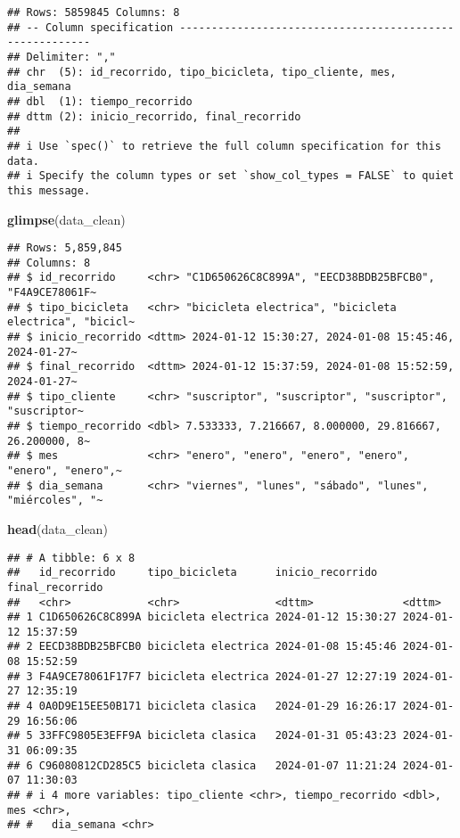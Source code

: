 \documentclass[
]{article}
\newenvironment{Shaded}{\begin{snugshade}}{\end{snugshade}}
\newcommand{\FunctionTok}[1]{\textcolor[rgb]{0.13,0.29,0.53}{\textbf{#1}}}
\newcommand{\NormalTok}[1]{#1}
\begin{document}
\begin{verbatim}
## Rows: 5859845 Columns: 8
## -- Column specification --------------------------------------------------------
## Delimiter: ","
## chr  (5): id_recorrido, tipo_bicicleta, tipo_cliente, mes, dia_semana
## dbl  (1): tiempo_recorrido
## dttm (2): inicio_recorrido, final_recorrido
## 
## i Use `spec()` to retrieve the full column specification for this data.
## i Specify the column types or set `show_col_types = FALSE` to quiet this message.
\end{verbatim}

\begin{Shaded}
\begin{Highlighting}[]
\FunctionTok{glimpse}\NormalTok{(data\_clean)}
\end{Highlighting}
\end{Shaded}

\begin{verbatim}
## Rows: 5,859,845
## Columns: 8
## $ id_recorrido     <chr> "C1D650626C8C899A", "EECD38BDB25BFCB0", "F4A9CE78061F~
## $ tipo_bicicleta   <chr> "bicicleta electrica", "bicicleta electrica", "bicicl~
## $ inicio_recorrido <dttm> 2024-01-12 15:30:27, 2024-01-08 15:45:46, 2024-01-27~
## $ final_recorrido  <dttm> 2024-01-12 15:37:59, 2024-01-08 15:52:59, 2024-01-27~
## $ tipo_cliente     <chr> "suscriptor", "suscriptor", "suscriptor", "suscriptor~
## $ tiempo_recorrido <dbl> 7.533333, 7.216667, 8.000000, 29.816667, 26.200000, 8~
## $ mes              <chr> "enero", "enero", "enero", "enero", "enero", "enero",~
## $ dia_semana       <chr> "viernes", "lunes", "sábado", "lunes", "miércoles", "~
\end{verbatim}

\begin{Shaded}
\begin{Highlighting}[]
\FunctionTok{head}\NormalTok{(data\_clean)}
\end{Highlighting}
\end{Shaded}

\begin{verbatim}
## # A tibble: 6 x 8
##   id_recorrido     tipo_bicicleta      inicio_recorrido    final_recorrido    
##   <chr>            <chr>               <dttm>              <dttm>             
## 1 C1D650626C8C899A bicicleta electrica 2024-01-12 15:30:27 2024-01-12 15:37:59
## 2 EECD38BDB25BFCB0 bicicleta electrica 2024-01-08 15:45:46 2024-01-08 15:52:59
## 3 F4A9CE78061F17F7 bicicleta electrica 2024-01-27 12:27:19 2024-01-27 12:35:19
## 4 0A0D9E15EE50B171 bicicleta clasica   2024-01-29 16:26:17 2024-01-29 16:56:06
## 5 33FFC9805E3EFF9A bicicleta clasica   2024-01-31 05:43:23 2024-01-31 06:09:35
## 6 C96080812CD285C5 bicicleta clasica   2024-01-07 11:21:24 2024-01-07 11:30:03
## # i 4 more variables: tipo_cliente <chr>, tiempo_recorrido <dbl>, mes <chr>,
## #   dia_semana <chr>
\end{verbatim}
\end{document}
